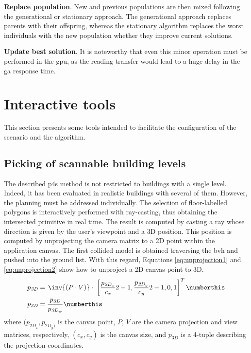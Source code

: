 \textbf{Replace population}. New and previous populations are then mixed following the generational or stationary approach. The generational approach replaces parents with their offspring, whereas the stationary algorithm replaces the worst individuals with the new population whether they improve current solutions.

\textbf{Update best solution}. It is noteworthy that even this minor operation must be performed in the \acrshort{gpu}, as the reading transfer would lead to a huge delay in the \acrshort{ga} response time.

\section{Interactive tools}

This section presents some tools intended to facilitate the configuration of the scenario and the algorithm.

\subsection{Picking of scannable building levels}

The described \acrshort{p4s} method is not restricted to buildings with a single level. Indeed, it has been evaluated in realistic buildings with several of them. However, the planning must be addressed individually. The selection of floor-labelled polygons is interactively performed with ray-casting, thus obtaining the intersected primitive in real time. The result is computed by casting a ray whose direction is given by the user's viewpoint and a 3D position. This position is computed by unprojecting the camera matrix to a 2D point within the application canvas. The first collided model is obtained traversing the \acrshort{bvh} and pushed into the ground list. With this regard, Equations \ref{eq:unprojection1} and \ref{eq:unprojection2} show how to unproject a 2D canvas point to 3D.
\begin{align*}
    p_{\textit{3D}} &= \hspace{.5mm} \inv{\left(P \cdot V\right)} \cdot \hspace{1mm} \left[\frac{p_{\mathit{2D}_x}}{c_x}2 - 1,  \frac{p_{\mathit{2D}_y}}{c_y}2 - 1, 0, 1\right]^T
    \numberthis \label{eq:unprojection1}\\
    p_{\textit{3D}} &= \frac{p_{\textit{3D}}}{p_{\textit{3D}_w}}
    \numberthis \label{eq:unprojection2}
\end{align*}
where $(p_{\textit{2D}_x}, p_{\textit{2D}_y)}$ is the canvas point, $P$, $V$ are the camera projection and view matrices, respectively, $(c_x, c_y)$ is the canvas size, and $p_{\textit{3D}}$ is a 4-tuple describing the projection coordinates.

